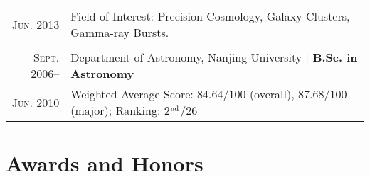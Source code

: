 \documentclass[letterpaper,10pt]{article}
\newcommand{\narrow}{-1.8ex}
\begin{document}
\begin{tabular}{r|p{5.7in}}
    \textsc{Jun. 2013}        & Field of Interest: Precision Cosmology, Galaxy Clusters, Gamma-ray Bursts. \\
    \multicolumn{2}{c}{} \\[\narrow]
    \textsc{Sept. 2006}--     &   Department of Astronomy, Nanjing University  |  \textbf{B.Sc. in Astronomy}    \\
    \textsc{Jun. 2010}        &   Weighted Average Score: 84.64/100 (overall), 87.68/100 (major); Ranking: 2$^{\rm nd}$/26
\end{tabular}


\section{Awards and Honors}
\end{document}
